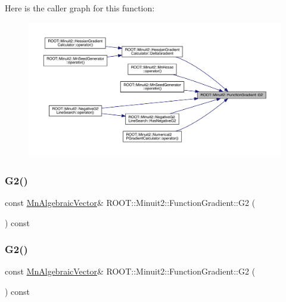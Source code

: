 Here is the caller graph for this function\+:
\nopagebreak
\begin{figure}[H]
\begin{center}
\leavevmode
\includegraphics[width=350pt]{d3/d48/classROOT_1_1Minuit2_1_1FunctionGradient_a6f99988a7fd1a61ed96c6709f02b6041_icgraph}
\end{center}
\end{figure}
\mbox{\label{classROOT_1_1Minuit2_1_1FunctionGradient_a6f99988a7fd1a61ed96c6709f02b6041}} 
\subsubsection{\texorpdfstring{G2()}{G2()}\hspace{0.1cm}{\footnotesize\ttfamily [2/3]}}
{\footnotesize\ttfamily const \mbox{\hyperlink{namespaceROOT_1_1Minuit2_a62ed97730a1ca8d3fbaec64a19aa11c9}{Mn\+Algebraic\+Vector}}\& R\+O\+O\+T\+::\+Minuit2\+::\+Function\+Gradient\+::\+G2 (\begin{DoxyParamCaption}{ }\end{DoxyParamCaption}) const\hspace{0.3cm}{\ttfamily [inline]}}

\mbox{\label{classROOT_1_1Minuit2_1_1FunctionGradient_a6f99988a7fd1a61ed96c6709f02b6041}} 
\subsubsection{\texorpdfstring{G2()}{G2()}\hspace{0.1cm}{\footnotesize\ttfamily [3/3]}}
{\footnotesize\ttfamily const \mbox{\hyperlink{namespaceROOT_1_1Minuit2_a62ed97730a1ca8d3fbaec64a19aa11c9}{Mn\+Algebraic\+Vector}}\& R\+O\+O\+T\+::\+Minuit2\+::\+Function\+Gradient\+::\+G2 (\begin{DoxyParamCaption}{ }\end{DoxyParamCaption}) const\hspace{0.3cm}{\ttfamily [inline]}}

